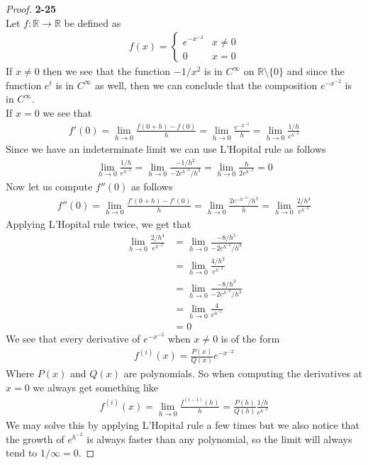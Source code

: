 \documentclass[11pt]{article}
\newcommand{\R}{\mathbb{R}}
\theoremstyle{definition}
\begin{document}
\cleardoublepage
\begin{proof}{\textbf{2-25}}\\
Let $f:\R\to\R$ be defined as
\begin{align*}
    f(x) = \begin{cases}
        e^{-x^{-2}} & x \neq 0\\
        0 & x = 0
    \end{cases}
\end{align*}
If $x \neq 0$ then we see that the function $-1/x^2$ is in $C^\infty$ on
$\R \setminus \{0\}$ and since the function $e^{t}$ is in $C^{\infty}$ as well,
then we can conclude that the composition $e^{-x^{-2}}$ is in $C^\infty$.
\\
If $x = 0$ we see that
\begin{align*}
    f'(0) = \lim_{h\to 0} \frac{f(0 + h) - f(0)}{h}
    = \lim_{h\to 0} \frac{e^{-h^{-2}}}{h}
    = \lim_{h\to 0} \frac{1/h}{e^{h^{-2}}}
\end{align*}
Since we have an indeterminate limit we can use L'Hopital rule as follows
\begin{align*}
    \lim_{h\to 0} \frac{1/h}{e^{h^{-2}}}
    = \lim_{h\to 0} \frac{-1/h^2}{-2e^{h^{-2}}/h^3}
    = \lim_{h\to 0} \frac{h}{2e^{h^{-2}}}
    = 0
\end{align*}
Now let us compute $f''(0)$ as follows
\begin{align*}
    f''(0) = \lim_{h\to 0} \frac{f'(0 + h) - f'(0)}{h}
    = \lim_{h\to 0} \frac{2e^{-h^{-2}}/h^3}{h}
    = \lim_{h\to 0} \frac{2/h^4}{e^{h^{-2}}}
\end{align*}
Applying L'Hopital rule twice, we get that
\begin{align*}
    \lim_{h\to 0} \frac{2/h^4}{e^{h^{-2}}}
    &= \lim_{h\to 0} \frac{-8/h^5}{-2e^{h^{-2}}/h^3}\\
    &= \lim_{h\to 0} \frac{4/h^2}{e^{h^{-2}}}\\
    &= \lim_{h\to 0} \frac{-8/h^3}{-2e^{h^{-2}}/h^3}\\
    &= \lim_{h\to 0} \frac{4}{e^{h^{-2}}}\\
    &= 0
\end{align*}
We see that every derivative of $e^{-x^{-2}}$ when $x\neq 0$ is of the form
\begin{align*}
    f^{(i)}(x) = \frac{P(x)}{Q(x)}e^{-x^{-2}}
\end{align*}
Where $P(x)$ and $Q(x)$ are polynomials. So when computing the derivatives
at $x = 0$ we always get something like
\begin{align*}
    f^{(i)}(x) = \lim_{h\to 0} \frac{f^{(i-1)}(h)}{h}
    = \frac{P(h)}{Q(h)}\frac{1/h}{e^{h^{-2}}}
\end{align*}
We may solve this by applying L'Hopital rule a few times but we also notice
that the growth of $e^{h^{-2}}$ is always faster than any polynomial, so the 
limit will always tend to $1/\infty = 0$.
\end{proof}
\end{document}
